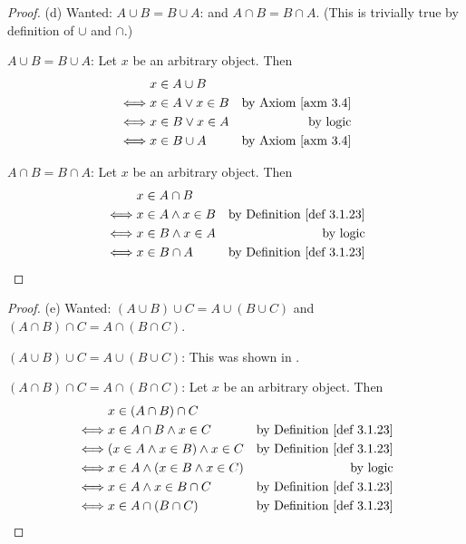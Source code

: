 \begin{proof}{(d)} Wanted: \(A \cup B = B \cup A\): and \(A \cap B = B \cap A\). (This is trivially true by definition of \(\cup\) and \(\cap\).)

\(A \cup B = B \cup A\): Let \(x\) be an arbitrary object. Then
\begin{align*}
         & x \in A \cup B \\
    \iff & x \in A \lor x \in B & \text{by \AXM{3.4}} \\
    \iff & x \in B \lor x \in A & \text{by logic} \\
    \iff & x \in B \cup A & \text{by \AXM{3.4}} \\
\end{align*}

\(A \cap B = B \cap A\): Let \(x\) be an arbitrary object. Then
\begin{align*}
         & x \in A \cap B \\
    \iff & x \in A \land x \in B & \text{by \DEF{3.1.23}} \\
    \iff & x \in B \land x \in A & \text{by logic} \\
    \iff & x \in B \cap A & \text{by \DEF{3.1.23}} \\
\end{align*}
\end{proof}


\begin{proof}{(e)} Wanted: \((A \cup B) \cup C = A \cup (B \cup C)\) and \((A \cap B) \cap C = A \cap (B \cap C)\).

\((A \cup B) \cup C = A \cup (B \cup C)\): This was shown in .

\((A \cap B) \cap C = A \cap (B \cap C)\): Let \(x\) be an arbitrary object. Then
\begin{align*}
         & x \in (A \cap B) \cap C \\
    \iff & x \in A \cap B \land x \in C & \text{by \DEF{3.1.23}} \\
    \iff & (x \in A \land x \in B) \land x \in C & \text{by \DEF{3.1.23}} \\
    \iff & x \in A \land (x \in B \land x \in C) & \text{by logic} \\
    \iff & x \in A \land x \in B \cap C & \text{by \DEF{3.1.23}} \\
    \iff & x \in A \cap (B \cap C) & \text{by \DEF{3.1.23}} \\
\end{align*}
\end{proof}

